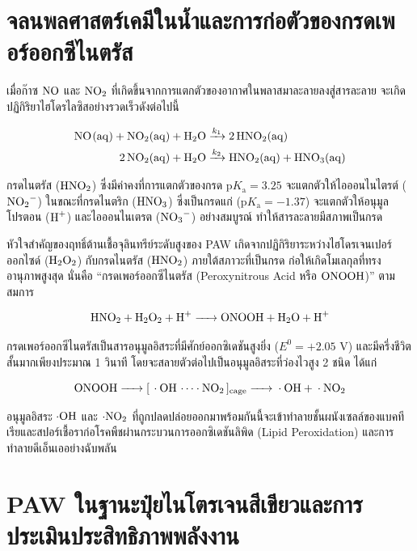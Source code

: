 \section{จลนพลศาสตร์เคมีในน้ำและการก่อตัวของกรดเพอร์ออกซีไนตรัส}

เมื่อก๊าซ $\ce{NO}$ และ $\ce{NO2}$ ที่เกิดขึ้นจากการแตกตัวของอากาศในพลาสมาละลายลงสู่สารละลาย จะเกิดปฏิกิริยาไฮโดรไลซิสอย่างรวดเร็วดังต่อไปนี้

\begin{align}
    \ce{NO(aq) + NO2(aq) + H2O} &\xrightarrow{k_1} \ce{2 HNO2(aq)} \label{eq:hno2_formation} \\
    \ce{2 NO2(aq) + H2O} &\xrightarrow{k_2} \ce{HNO2(aq) + HNO3(aq)} \label{eq:hno3_formation}
\end{align}

กรดไนตรัส ($\ce{HNO2}$) ซึ่งมีค่าคงที่การแตกตัวของกรด $\text{p}K_{\text{a}} = 3.25$ จะแตกตัวให้ไอออนไนไตรต์ ($\ce{NO2-}$) ในขณะที่กรดไนตริก ($\ce{HNO3}$) ซึ่งเป็นกรดแก่ ($\text{p}K_{\text{a}} = -1.37$) จะแตกตัวให้อนุมูลโปรตอน ($\ce{H+}$) และไอออนไนเตรต ($\ce{NO3-}$) อย่างสมบูรณ์ ทำให้สารละลายมีสภาพเป็นกรด

หัวใจสำคัญของฤทธิ์ต้านเชื้อจุลินทรีย์ระดับสูงของ PAW เกิดจากปฏิกิริยาระหว่างไฮโดรเจนเปอร์ออกไซด์ ($\ce{H2O2}$) กับกรดไนตรัส ($\ce{HNO2}$) ภายใต้สภาวะที่เป็นกรด ก่อให้เกิดโมเลกุลที่ทรงอานุภาพสูงสุด นั่นคือ ``กรดเพอร์ออกซีไนตรัส (Peroxynitrous Acid หรือ $\ce{ONOOH}$)'' ตามสมการ

\begin{equation}
    \ce{HNO2 + H2O2 + H+ -> ONOOH + H2O + H+}
    \label{eq:onooh_formation}
\end{equation}

กรดเพอร์ออกซีไนตรัสเป็นสารอนุมูลอิสระที่มีศักย์ออกซิเดชันสูงยิ่ง ($E^0 = +2.05 \text{ V}$) และมีครึ่งชีวิตสั้นมากเพียงประมาณ 1 วินาที โดยจะสลายตัวต่อไปเป็นอนุมูลอิสระที่ว่องไวสูง 2 ชนิด ได้แก่

\begin{equation}
    \ce{ONOOH -> [ \cdot OH \dots \cdot NO2 ]_{cage} -> \cdot OH + \cdot NO2}
    \label{eq:onooh_decomposition}
\end{equation}

อนุมูลอิสระ $\cdot\ce{OH}$ และ $\cdot\ce{NO2}$ ที่ถูกปลดปล่อยออกมาพร้อมกันนี้จะเข้าทำลายชั้นผนังเซลล์ของแบคทีเรียและสปอร์เชื้อราก่อโรคพืชผ่านกระบวนการออกซิเดชันลิพิด (Lipid Peroxidation) และการทำลายดีเอ็นเออย่างฉับพลัน

\section{PAW ในฐานะปุ๋ยไนโตรเจนสีเขียวและการประเมินประสิทธิภาพพลังงาน}

